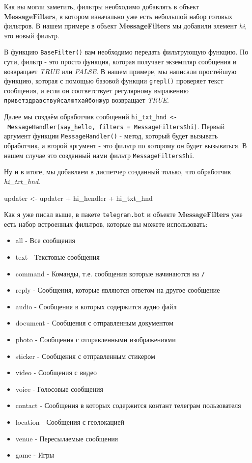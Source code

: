 \documentclass[
]{book}
\newenvironment{Shaded}{\begin{snugshade}}{\end{snugshade}}
\newcommand{\NormalTok}[1]{#1}
\newcommand{\OtherTok}[1]{\textcolor[rgb]{0.56,0.35,0.01}{#1}}
\newcommand{\SpecialCharTok}[1]{\textcolor[rgb]{0.00,0.00,0.00}{#1}}
\providecommand{\tightlist}{%
  \setlength{\itemsep}{0pt}\setlength{\parskip}{0pt}}
\begin{document}
Как вы могли заметить, фильтры необходимо добавлять в объект \textbf{MessageFilters}, в котором изначально уже есть небольшой набор готовых фильтров. В нашем примере в объект \textbf{MessageFilters} мы добавили элемент \emph{hi}, это новый фильтр.

В функцию \texttt{BaseFilter()} вам необходимо передать фильтрующую функцию. По сути, фильтр - это просто функция, которая получает экземпляр сообщения и возвращает \emph{TRUE} или \emph{FALSE}. В нашем примере, мы написали простейшую функцию, которая с помощью базовой функции \texttt{grepl()} проверяет текст сообщения, и если он соответствует регулярному выражению \texttt{привет\textbar{}здравствуй\textbar{}салют\textbar{}хай\textbar{}бонжур} возвращает \emph{TRUE}.

Далее мы создаём обработчик сообщений \texttt{hi\_txt\_hnd\ \textless{}-\ MessageHandler(say\_hello,\ filters\ =\ MessageFilters\$hi)}. Первый аргумент функции \texttt{MessageHandler()} - метод, который будет вызывать обработчик, а второй аргумент - это фильтр по которому он будет вызываться. В нашем случае это созданный нами фильтр \texttt{MessageFilters\$hi}.

Ну и в итоге, мы добавляем в диспетчер созданный только, что обработчик \emph{hi\_txt\_hnd}.

\begin{Shaded}
\begin{Highlighting}[]
\NormalTok{updater }\OtherTok{\textless{}{-}}\NormalTok{ updater }\SpecialCharTok{+}
\NormalTok{             hi\_hendler }\SpecialCharTok{+}
\NormalTok{             hi\_txt\_hnd}
\end{Highlighting}
\end{Shaded}

Как я уже писал выше, в пакете \texttt{telegram.bot} и объекте \textbf{MessageFilters} уже есть набор встроенных фильтров, которые вы можете использовать:

\begin{itemize}
\tightlist
\item
  all - Все сообщения
\item
  text - Текстовые сообщения
\item
  command - Команды, т.е. сообщения которые начинаются на \texttt{/}
\item
  reply - Сообщения, которые являются ответом на другое сообщение
\item
  audio - Сообщения в которых содержится аудио файл
\item
  document - Сообщения с отправленным документом
\item
  photo - Сообщения с отправленными изображениями
\item
  sticker - Сообщения с отправленным стикером
\item
  video - Сообщения с видео
\item
  voice - Голосовые сообщения
\item
  contact - Сообщения в которых содержится контант телеграм пользователя
\item
  location - Сообщения с геолокацией
\item
  venue - Пересылаемые сообщения
\item
  game - Игры
\end{itemize}
\end{document}
